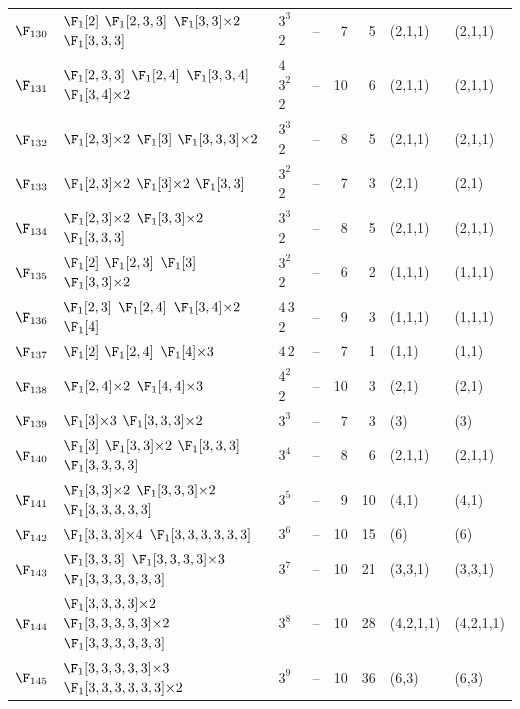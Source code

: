 \begin{landscape}
{\begin{longtable}{@{}l p{8.2cm} l l r r l l@{}}
$\F_{130}$ & $\F_{1}[2]$\; $\F_{1}[2,3,3]$\; $\F_{1}[3,3]{\times}2$\; $\F_{1}[3,3,3]$ & $3^{3}$\,$2$ & -- & 7 & 5 & (2,1,1) & (2,1,1) \\
$\F_{131}$ & $\F_{1}[2,3,3]$\; $\F_{1}[2,4]$\; $\F_{1}[3,3,4]$\; $\F_{1}[3,4]{\times}2$ & $4$\,$3^{2}$\,$2$ & -- & 10 & 6 & (2,1,1) & (2,1,1) \\
$\F_{132}$ & $\F_{1}[2,3]{\times}2$\; $\F_{1}[3]$\; $\F_{1}[3,3,3]{\times}2$ & $3^{3}$\,$2$ & -- & 8 & 5 & (2,1,1) & (2,1,1) \\
$\F_{133}$ & $\F_{1}[2,3]{\times}2$\; $\F_{1}[3]{\times}2$\; $\F_{1}[3,3]$ & $3^{2}$\,$2$ & -- & 7 & 3 & (2,1) & (2,1) \\
$\F_{134}$ & $\F_{1}[2,3]{\times}2$\; $\F_{1}[3,3]{\times}2$\; $\F_{1}[3,3,3]$ & $3^{3}$\,$2$ & -- & 8 & 5 & (2,1,1) & (2,1,1) \\
$\F_{135}$ & $\F_{1}[2]$\; $\F_{1}[2,3]$\; $\F_{1}[3]$\; $\F_{1}[3,3]{\times}2$ & $3^{2}$\,$2$ & -- & 6 & 2 & (1,1,1) & (1,1,1) \\
$\F_{136}$ & $\F_{1}[2,3]$\; $\F_{1}[2,4]$\; $\F_{1}[3,4]{\times}2$\; $\F_{1}[4]$ & $4$\,$3$\,$2$ & -- & 9 & 3 & (1,1,1) & (1,1,1) \\
$\F_{137}$ & $\F_{1}[2]$\; $\F_{1}[2,4]$\; $\F_{1}[4]{\times}3$ & $4$\,$2$ & -- & 7 & 1 & (1,1) & (1,1) \\
$\F_{138}$ & $\F_{1}[2,4]{\times}2$\; $\F_{1}[4,4]{\times}3$ & $4^{2}$\,$2$ & -- & 10 & 3 & (2,1) & (2,1) \\
$\F_{139}$ & $\F_{1}[3]{\times}3$\; $\F_{1}[3,3,3]{\times}2$ & $3^{3}$ & -- & 7 & 3 & (3) & (3) \\
$\F_{140}$ & $\F_{1}[3]$\; $\F_{1}[3,3]{\times}2$\; $\F_{1}[3,3,3]$\; $\F_{1}[3,3,3,3]$ & $3^{4}$ & -- & 8 & 6 & (2,1,1) & (2,1,1) \\
$\F_{141}$ & $\F_{1}[3,3]{\times}2$\; $\F_{1}[3,3,3]{\times}2$\; $\F_{1}[3,3,3,3,3]$ & $3^{5}$ & -- & 9 & 10 & (4,1) & (4,1) \\
$\F_{142}$ & $\F_{1}[3,3,3]{\times}4$\; $\F_{1}[3,3,3,3,3,3]$ & $3^{6}$ & -- & 10 & 15 & (6) & (6) \\
$\F_{143}$ & $\F_{1}[3,3,3]$\; $\F_{1}[3,3,3,3]{\times}3$\; $\F_{1}[3,3,3,3,3,3]$ & $3^{7}$ & -- & 10 & 21 & (3,3,1) & (3,3,1) \\
$\F_{144}$ & $\F_{1}[3,3,3,3]{\times}2$\; $\F_{1}[3,3,3,3,3]{\times}2$\; $\F_{1}[3,3,3,3,3,3]$ & $3^{8}$ & -- & 10 & 28 & (4,2,1,1) & (4,2,1,1) \\
$\F_{145}$ & $\F_{1}[3,3,3,3,3]{\times}3$\; $\F_{1}[3,3,3,3,3,3]{\times}2$ & $3^{9}$ & -- & 10 & 36 & (6,3) & (6,3) \\

\end{longtable}}
\end{landscape}
